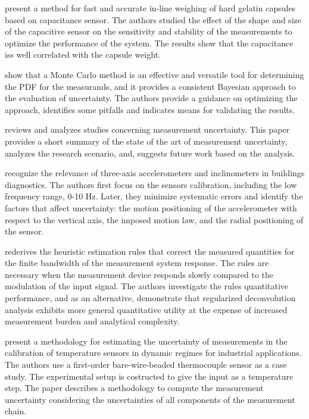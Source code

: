 \documentclass[11pt]{article}
\begin{document}
\citet{Burmen09} present a method for fast and accurate in-line weighing of hard gelatin capsules based on capacitance sensor. The authors studied the effect of the shape and size of the capacitive sensor on the sensitivity and stability of the measurements to optimize the performance of the system. The results show that the capacitance iss well correlated with the capsule weight.

\citet{Cox06} show that a Monte Carlo method is an effective and versatile tool for determining the PDF for the measurands, and it provides a consistent Bayesian approach to the evaluation of uncertainty. The authors provide a guidance on optimizing the approach, identifies some pitfalls and indicates means for validating the results.

\citet{daSilva12} reviews and analyzes studies concerning measurement uncertainty. This paper provides a short summary of the state of the art of measurement uncertainty, analyzes the research scenario, and, suggests future work based on the analysis.

\citet{DEmilia16} recognize the relevance of three-axis accelerometers and inclinometers in buildings diagnostics. The authors first focus on the sensors calibration, including the low frequency range, 0-10 Hz. Later, they minimize systematic errors and identify the factors that affect uncertainty: the motion positioning of the accelerometer with respect to the vertical axis, the imposed motion law, and the radial positioning of the sensor. 

\citet{Dienstfrey14} rederives the heuristic estimation rules that correct the measured quantities for the finite bandwidth of the measurement system response.
The rules are necessary when the measurement device responds slowly compared to the modulation of the input signal. The authors investigate the rules quantitative performance, and as an alternative, demonstrate that regularized deconvolution analysis exhibits more general quantitative utility at the expense of increased measurement burden and analytical complexity.

\citet{Diniz17} present a methodology for estimating the uncertainty of measurements in the calibration of temperature sensors in dynamic regimes for industrial applications. The authors use a first-order bare-wire-beaded thermocouple sensor as a case study. The experimental setup is costructed to give the input as a temperature step. The paper describes a methodology to compute the measurement uncertainty considering the uncertainties of all components of the measurement chain.
\end{document}
